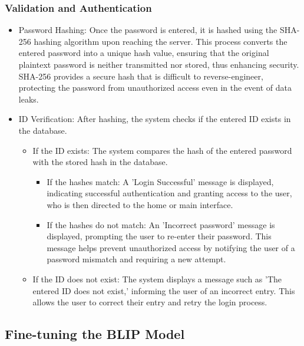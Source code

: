 \documentclass[conference]{IEEEtran}
\begin{document}
\subsubsection{Validation and Authentication}
\begin{itemize}
    \item Password Hashing: Once the password is entered, it is hashed using the SHA-256 hashing algorithm upon reaching the server. This process converts the entered password into a unique hash value, ensuring that the original plaintext password is neither transmitted nor stored, thus enhancing security. SHA-256 provides a secure hash that is difficult to reverse-engineer, protecting the password from unauthorized access even in the event of data leaks.\\
    \item ID Verification: After hashing, the system checks if the entered ID exists in the database.
    \begin{itemize}
        \item If the ID exists: The system compares the hash of the entered password with the stored hash in the database.
        \begin{itemize}
            \item If the hashes match: A 'Login Successful' message is displayed, indicating successful authentication and granting access to the user, who is then directed to the home or main interface.\\
            \item If the hashes do not match: An 'Incorrect password' message is displayed, prompting the user to re-enter their password. This message helps prevent unauthorized access by notifying the user of a password mismatch and requiring a new attempt.\\
        \end{itemize}
        \item If the ID does not exist: The system displays a message such as 'The entered ID does not exist,' informing the user of an incorrect entry. This allows the user to correct their entry and retry the login process.\\
    \end{itemize}
\end{itemize}


\subsection{Fine-tuning the BLIP Model}
\end{document}
